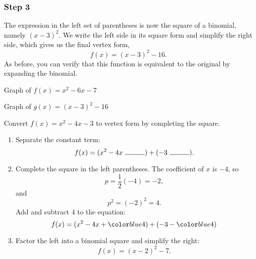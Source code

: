 \documentclass{ximera}
\begin{document}
\subsubsection{Step 3}
The expression in the left set of parentheses is now the square of a binomial, namely $(x-3)^2$. We write the left side in its square form and simplify the right side, which gives us the final vertex form,
$$
    f(x) = (x-3)^2 - 16.
$$
As before, you can verify that this function is equivalent to the original by expanding the binomial.


    Graph of $f(x)=x^2 - 6x - 7$ 
    \begin{image}
    \end{image}
    Graph of $g(x)=(x-3)^2-16$
    \begin{image}
    \end{image}
\begin{example}
Convert $f(x) = x^2 - 4x - 3$ to vertex form by completing the square.

\begin{explanation}
\begin{enumerate}[label=\arabic*.]
    \item Separate the constant term:
    $$
        f(x) = (x^2 - 4x\ \rule{1cm}{0.15mm}) + (-3\ \rule{1cm}{0.15mm}).
    $$
    \item Complete the square in the left parentheses. The coefficient of $x$ is $-4$, so
    $$
        p = \frac{1}{2}(-4) = -2,
    $$
    and
    $$
        p^2 = (-2)^2 = 4.
    $$
    Add and subtract $4$ to the equation:
    $$
        f(x) = (x^2 - 4x + \substitute{4}) + (-3-\substitute{4})
    $$
    \item Factor the left into a binomial square and simplify the right:
    $$
        f(x) = (x-2)^2 - 7.
    $$
\end{enumerate}
\end{explanation}
\end{example}
\end{document}
